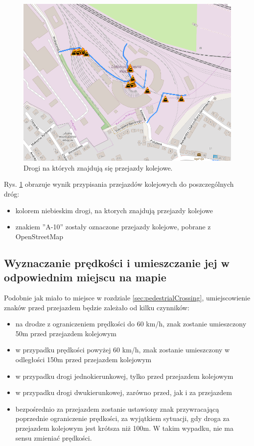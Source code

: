 \begin{figure}[h]
\caption{Drogi na których znajdują się przejazdy kolejowe.}
\label{sec:PrzejazdyKolejowe}
\centering
\includegraphics[width=1.0\textwidth]{railCrossing}
\end{figure}

Rys. \ref{sec:PrzejazdyKolejowe} obrazuje wynik przypisania przejazdów kolejowych do poszczególnych dróg:
\begin{itemize}
\item kolorem niebieskim drogi, na ktorych znajdują przejazdy kolejowe
\item znakiem ''A-10'' zostały oznaczone przejazdy kolejowe, pobrane z OpenStreetMap
\end{itemize}

\newpage
\subsection{Wyznaczanie prędkości i umieszczanie jej w odpowiednim miejscu na mapie}

Podobnie jak miało to miejsce w rozdziale \ref{sec:pedestrialCrossing}, umiejscowienie znaków przed przejazdem będzie zależało od kilku czynników:
\begin{itemize}
\item na  drodze z ograniczeniem prędkości do 60 km/h, znak zostanie umieszczony 50m przed przejazdem kolejowym
\item w przypadku prędkości powyżej 60 km/h, znak zostanie umieszczony w odległości 150m przed przejazdem kolejowym
\item w przypadku drogi jednokierunkowej, tylko przed przejazdem kolejowym
\item w przypadku drogi dwukierunkowej, zarówno przed, jak i za przejazdem
\item bezpośrednio za przejazdem zostanie ustawiony znak przywracającą poprzednie ograniczenie prędkości, za wyjątkiem sytuacji, gdy droga za przejazdem kolejowym jest krótsza niż 100m. W takim wypadku, nie ma sensu zmieniać prędkości.
\end{itemize}

